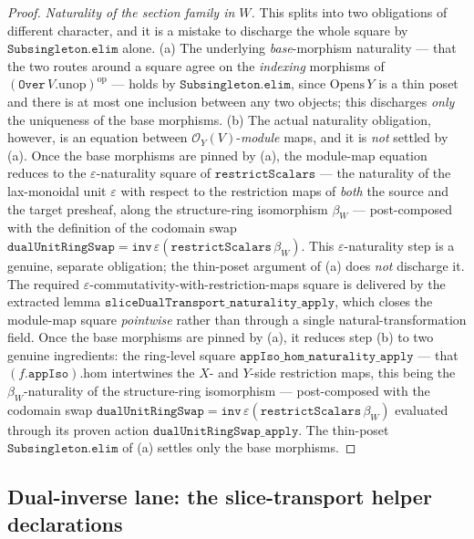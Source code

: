 \begin{proof}
  \emph{Naturality of the section family in \(W\).} This splits into two obligations of
  different character, and it is a mistake to discharge the whole square by
  \(\mathtt{Subsingleton.elim}\) alone. (a) The underlying \emph{base}-morphism naturality ---
  that the two routes around a square agree on the \emph{indexing} morphisms of
  \((\mathtt{Over}\,V.\mathrm{unop})^{\mathrm{op}}\) --- holds by \(\mathtt{Subsingleton.elim}\),
  since \(\mathrm{Opens}\,Y\) is a thin poset and there is at most one inclusion between any
  two objects; this discharges \emph{only} the uniqueness of the base morphisms. (b) The
  actual naturality obligation, however, is an equation between
  \(\mathcal{O}_Y(V)\)-\emph{module} maps, and it is \emph{not} settled by (a). Once the base
  morphisms are pinned by (a), the module-map equation reduces to the \(\varepsilon\)-naturality
  square of \(\mathtt{restrictScalars}\) --- the naturality of the lax-monoidal unit
  \(\varepsilon\) with respect to the restriction maps of \emph{both} the source and the target
  presheaf, along the structure-ring isomorphism \(\beta_W\) --- post-composed with the
  definition of the codomain swap \(\mathtt{dualUnitRingSwap} = \mathtt{inv}\,
  \varepsilon(\mathtt{restrictScalars}\,\beta_W)\). This \(\varepsilon\)-naturality step is a
  genuine, separate obligation; the thin-poset argument of (a) does \emph{not} discharge it.
  The required \(\varepsilon\)-commutativity-with-restriction-maps square is delivered by the
  extracted lemma \(\mathtt{sliceDualTransport\_naturality\_apply}\), which closes the
  module-map square \emph{pointwise} rather than through a single natural-transformation
  field. Once the base morphisms are pinned by (a), it reduces step (b) to two genuine
  ingredients: the ring-level square \(\mathtt{appIso\_hom\_naturality\_apply}\) --- that
  \((f.\mathtt{appIso}).\mathrm{hom}\) intertwines the \(X\)- and \(Y\)-side restriction maps,
  this being the \(\beta_W\)-naturality of the structure-ring isomorphism --- post-composed with
  the codomain swap \(\mathtt{dualUnitRingSwap} = \mathtt{inv}\,\varepsilon(\mathtt{restrictScalars}\,
  \beta_W)\) evaluated through its proven action \(\mathtt{dualUnitRingSwap\_apply}\). The
  thin-poset \(\mathtt{Subsingleton.elim}\) of (a) settles only the base morphisms.
\end{proof}

\subsection{Dual-inverse lane: the slice-transport helper declarations}
\label{subsec:dual_inverse_helpers}

